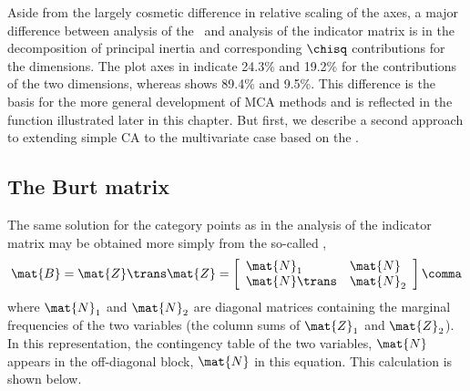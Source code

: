 \documentclass[11pt]{book}
\renewenvironment{knitrout}{\small\renewcommand{\baselinestretch}{.85}}{} %
\begin{document}
Aside from the largely cosmetic difference in relative scaling of the axes,
a major difference between analysis of the \ctab\ and analysis of the
indicator matrix is in the decomposition of principal inertia and corresponding
$\chisq$ contributions
for the dimensions. The plot axes in 
indicate 24.3\% and 19.2\% for the contributions of the two dimensions,
whereas  shows 89.4\% and 9.5\%.
This difference is the basis for the more general development of MCA methods
and is reflected in the  function illustrated later in this chapter.
But first, we describe a second approach to extending simple CA to the
multivariate case based on the .

\subsection{The Burt matrix}\label{sec:mca-burt}

The same solution for the category points as in the
analysis of the indicator matrix may be obtained more simply
from the so-called  \citep{Burt:50},
\begin{equation*}%
 \mat{B} = \mat{Z}\trans \mat{Z}
 =
 \left[
 \begin{array}{ll}
 \mat{N}_{1} & \mat{N} \\
 \mat{N}\trans & \mat{N}_{2} \\
 \end{array}
 \right]
 \comma
\end{equation*}
where $\mat{N}_{1}$ and $\mat{N}_{2}$ are diagonal matrices containing
the marginal frequencies of the two variables (the column sums of
$\mat{Z}_1$ and $\mat{Z}_2$).  In this representation, the contingency
table of the two variables, $\mat{N}$ appears in the off-diagonal block,
$\mat{N}$ in this equation. This calculation is shown below.

\begin{knitrout}
\color{fgcolor}
\end{knitrout}
\end{document}
